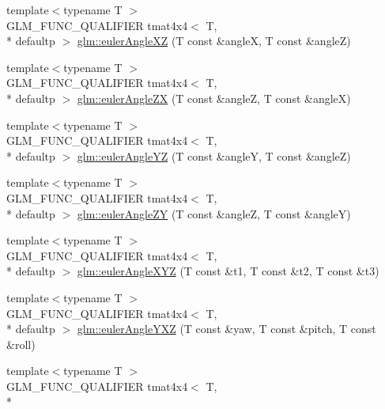 \begin{DoxyCompactItemize}
\item 
{\footnotesize template$<$typename T $>$ }\\G\-L\-M\-\_\-\-F\-U\-N\-C\-\_\-\-Q\-U\-A\-L\-I\-F\-I\-E\-R tmat4x4$<$ T, \\*
defaultp $>$ \hyperlink{group__gtx__euler__angles_gab2d7dc94b9a7519d741aaa208c7a335b}{glm\-::euler\-Angle\-X\-Z} (T const \&angle\-X, T const \&angle\-Z)
\item 
{\footnotesize template$<$typename T $>$ }\\G\-L\-M\-\_\-\-F\-U\-N\-C\-\_\-\-Q\-U\-A\-L\-I\-F\-I\-E\-R tmat4x4$<$ T, \\*
defaultp $>$ \hyperlink{group__gtx__euler__angles_gaef83cf40bd9ae780011b29970f16f622}{glm\-::euler\-Angle\-Z\-X} (T const \&angle\-Z, T const \&angle\-X)
\item 
{\footnotesize template$<$typename T $>$ }\\G\-L\-M\-\_\-\-F\-U\-N\-C\-\_\-\-Q\-U\-A\-L\-I\-F\-I\-E\-R tmat4x4$<$ T, \\*
defaultp $>$ \hyperlink{group__gtx__euler__angles_ga1033f84f51d61646145352ef0c1bb58c}{glm\-::euler\-Angle\-Y\-Z} (T const \&angle\-Y, T const \&angle\-Z)
\item 
{\footnotesize template$<$typename T $>$ }\\G\-L\-M\-\_\-\-F\-U\-N\-C\-\_\-\-Q\-U\-A\-L\-I\-F\-I\-E\-R tmat4x4$<$ T, \\*
defaultp $>$ \hyperlink{group__gtx__euler__angles_ga02f037926568bbd12dfece3b28b20343}{glm\-::euler\-Angle\-Z\-Y} (T const \&angle\-Z, T const \&angle\-Y)
\item 
{\footnotesize template$<$typename T $>$ }\\G\-L\-M\-\_\-\-F\-U\-N\-C\-\_\-\-Q\-U\-A\-L\-I\-F\-I\-E\-R tmat4x4$<$ T, \\*
defaultp $>$ \hyperlink{group__gtx__euler__angles_gaaedda1657a1aebe0a904d864b33844e8}{glm\-::euler\-Angle\-X\-Y\-Z} (T const \&t1, T const \&t2, T const \&t3)
\item 
{\footnotesize template$<$typename T $>$ }\\G\-L\-M\-\_\-\-F\-U\-N\-C\-\_\-\-Q\-U\-A\-L\-I\-F\-I\-E\-R tmat4x4$<$ T, \\*
defaultp $>$ \hyperlink{group__gtx__euler__angles_ga0242b5ab68651db70c6025815549427f}{glm\-::euler\-Angle\-Y\-X\-Z} (T const \&yaw, T const \&pitch, T const \&roll)
\item 
{\footnotesize template$<$typename T $>$ }\\G\-L\-M\-\_\-\-F\-U\-N\-C\-\_\-\-Q\-U\-A\-L\-I\-F\-I\-E\-R tmat4x4$<$ T, \\*

\end{DoxyCompactItemize}
